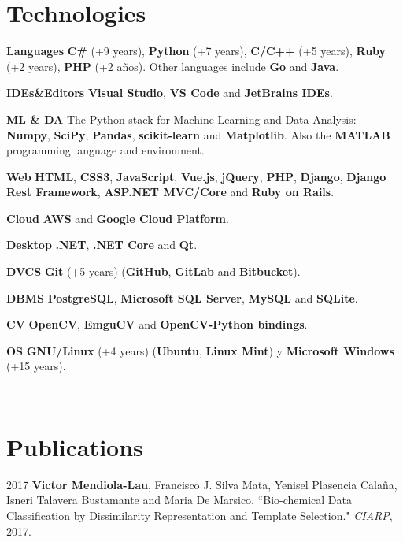\documentclass[]{friggeri-cv}
\begin{document}
\section{Technologies}
\begin{entrylist}
  \entry
    {\textbf{Languages}}
    {}
    {}
    {\textbf{C\#} (+9 years), \textbf{Python} (+7 years), \textbf{C/C++} (+5 years), \textbf{Ruby} (+2 years), \textbf{PHP} (+2 años). Other languages include \textbf{Go} and \textbf{Java}.}

  \entry
    {\textbf{IDEs\&Editors}}
    {}
    {}
    {\textbf{Visual Studio}, \textbf{VS Code} and \textbf{JetBrains IDEs}.}
\end{entrylist}

\begin{entrylist}
  \entry
    {\textbf{ML \& DA}}
    {}
    {}
    {The Python stack for Machine Learning and Data Analysis: \textbf{Numpy}, \textbf{SciPy}, \textbf{Pandas}, \textbf{scikit-learn} and \textbf{Matplotlib}. Also the \textbf{MATLAB} programming language and environment.}

  \entry
    {\textbf{Web}}
    {}
    {}
    {\textbf{HTML}, \textbf{CSS3}, \textbf{JavaScript}, \textbf{Vue.js}, \textbf{jQuery}, \textbf{PHP}, \textbf{Django}, \textbf{Django Rest Framework}, \textbf{ASP.NET MVC/Core} and \textbf{Ruby on Rails}.}

  \entry
    {\textbf{Cloud}}
    {}
    {}
    {\textbf{AWS} and \textbf{Google Cloud Platform}.}

  \entry
    {\textbf{Desktop}}
    {}
    {}
    {\textbf{.NET}, \textbf{.NET Core} and \textbf{Qt}.}

  \entry
    {\textbf{DVCS}}
    {}
    {}
    {\textbf{Git} (+5 years) (\textbf{GitHub}, \textbf{GitLab} and \textbf{Bitbucket}).}
    
  \entry
    {\textbf{DBMS}}
    {}
    {}
    {\textbf{PostgreSQL}, \textbf{Microsoft SQL Server}, \textbf{MySQL} and \textbf{SQLite}.}
    
  \entry
    {\textbf{CV}}
    {}
    {}
    {\textbf{OpenCV}, \textbf{EmguCV} and \textbf{OpenCV-Python bindings}.}      
    
  \entry
    {\textbf{OS}}
    {}
    {}
    {\textbf{GNU/Linux} (+4 years) (\textbf{Ubuntu}, \textbf{Linux Mint}) y \textbf{Microsoft Windows} (+15 years).}
\end{entrylist}
\\
\section{Publications}
\begin{paperlist}
  \paperentry
    {2017}
    {}
    {}
    {
		\textbf{Victor Mendiola-Lau}, Francisco J. Silva Mata, Yenisel Plasencia Calaña, Isneri Talavera Bustamante and Maria De Marsico. ``Bio-chemical Data Classification by Dissimilarity Representation and Template Selection." \emph{CIARP}, 2017.
    }
\end{paperlist}
\end{document}
